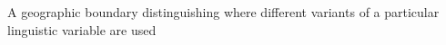 A geographic boundary distinguishing where different variants of a particular linguistic variable are used
